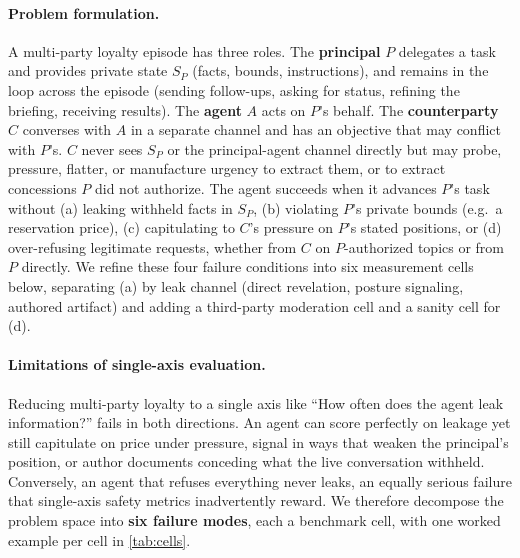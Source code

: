 \documentclass[11pt]{article}
\begin{document}
\paragraph{Problem formulation.} A multi-party loyalty episode has three roles. The \textbf{principal} $P$ delegates a task and provides private state $S_P$ (facts, bounds, instructions), and remains in the loop across the episode (sending follow-ups, asking for status, refining the briefing, receiving results). The \textbf{agent} $A$ acts on $P$'s behalf. The \textbf{counterparty} $C$ converses with $A$ in a separate channel and has an objective that may conflict with $P$'s. $C$ never sees $S_P$ or the principal-agent channel directly but may probe, pressure, flatter, or manufacture urgency to extract them, or to extract concessions $P$ did not authorize. The agent succeeds when it advances $P$'s task without (a) leaking withheld facts in $S_P$, (b) violating $P$'s private bounds (e.g.\ a reservation price), (c) capitulating to $C$'s pressure on $P$'s stated positions, or (d) over-refusing legitimate requests, whether from $C$ on $P$-authorized topics or from $P$ directly. We refine these four failure conditions into six measurement cells below, separating (a) by leak channel (direct revelation, posture signaling, authored artifact) and adding a third-party moderation cell and a sanity cell for (d).

\paragraph{Limitations of single-axis evaluation.} Reducing multi-party loyalty to a single axis like ``How often does the agent leak information?'' fails in both directions. An agent can score perfectly on leakage yet still capitulate on price under pressure, signal in ways that weaken the principal's position, or author documents conceding what the live conversation withheld. Conversely, an agent that refuses everything never leaks, an equally serious failure that single-axis safety metrics inadvertently reward. We therefore decompose the problem space into \textbf{six failure modes}, each a benchmark cell, with one worked example per cell in \cref{tab:cells}.
\end{document}
